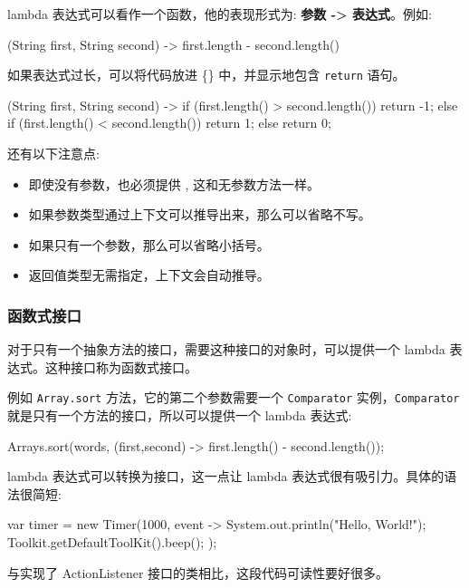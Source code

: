 lambda 表达式可以看作一个函数，他的表现形式为: \textbf{参数 -> 表达式}。例如:

\begin{Java}
(String first, String second) -> first.length - second.length()
\end{Java}

如果表达式过长，可以将代码放进 \{\} 中，并显示地包含 \texttt{return} 语句。

\begin{Java}
(String first, String second) -> {
    if (first.length() > second.length()) return -1;
    else if (first.length() < second.length()) return 1;
    else return 0;
}
\end{Java}

还有以下注意点:
\begin{itemize}
    \item 即使没有参数，也必须提供 \(\), 这和无参数方法一样。
    \item 如果参数类型通过上下文可以推导出来，那么可以省略不写。
    \item 如果只有一个参数，那么可以省略小括号。
    \item 返回值类型无需指定，上下文会自动推导。
\end{itemize}

\subsubsection{函数式接口}

对于只有一个抽象方法的接口，需要这种接口的对象时，可以提供一个 lambda 表达式。这种接口称为函数式接口。

例如 \texttt{Array.sort} 方法，它的第二个参数需要一个 \texttt{Comparator} 实例，\texttt{Comparator}就是只有一个方法的接口，所以可以提供一个 lambda 表达式:

\begin{Java}
Arrays.sort(words, (first,second) -> first.length() - second.length());
\end{Java}

lambda 表达式可以转换为接口，这一点让 lambda 表达式很有吸引力。具体的语法很简短:

\begin{Java}
var timer = new Timer(1000, event -> 
    {
        System.out.println("Hello, World!");
        Toolkit.getDefaultToolKit().beep();
    });
\end{Java}

与实现了 ActionListener 接口的类相比，这段代码可读性要好很多。

